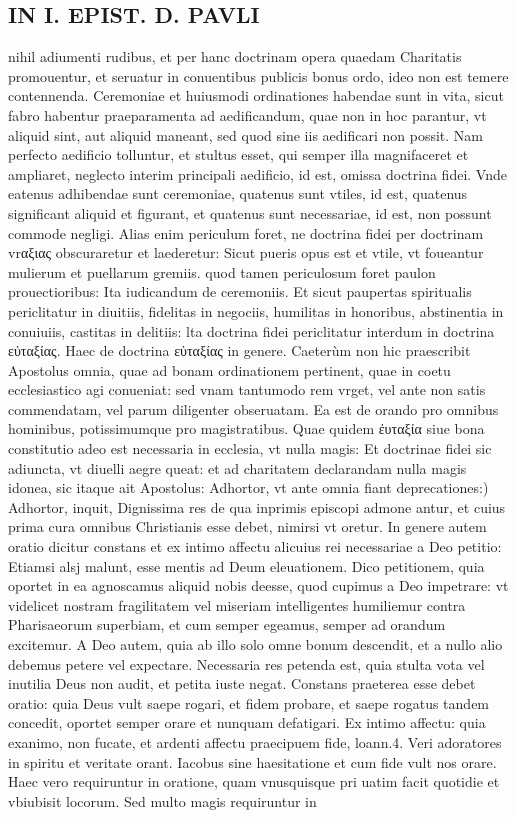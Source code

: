 \documentclass{article}
\begin{document}
\begin{pages}
\section*{IN I. EPIST. D. PAVLI }
\marginpar{[ p.64 ]}\pstart nihil adiumenti rudibus, et per hanc doctrinam opera quaedam Charitatis promouentur, et seruatur in conuentibus publicis bonus ordo, ideo non est temere contennenda. Ceremoniae et huiusmodi ordinationes habendae sunt in vita, sicut fabro habentur praeparamenta ad aedificandum, quae non in hoc parantur, vt aliquid sint, aut aliquid maneant, sed quod sine iis aedificari non possit. Nam perfecto aedificio tolluntur, et stultus esset, qui semper illa magnifaceret et ampliaret, neglecto interim principali aedificio, id est, omissa doctrina fidei. Vnde eatenus adhibendae sunt ceremoniae, quatenus sunt vtiles, id est, quatenus significant aliquid et figurant, et quatenus sunt necessariae, id est, non possunt commode negligi. Alias enim periculum foret, ne doctrina fidei per doctrinam vrαξιας obscuraretur et laederetur: Sicut pueris opus est et vtile, vt foueantur mulierum et puellarum gremiis. quod tamen periculosum foret paulon prouectioribus: Ita iudicandum de ceremoniis. Et sicut paupertas spiritualis periclitatur in diuitiis, fidelitas in negociis, humilitas in honoribus, abstinentia in conuiuiis, castitas in delitiis: lta doctrina fidei periclitatur interdum in doctrina εὐταξίας. Haec de doctrina εὐταξίας in genere.  \pend\pstart Caeterùm non hic praescribit Apostolus omnia, quae ad bonam ordinationem pertinent, quae in coetu ecclesiastico agi conueniat: sed vnam tantumodo rem vrget, vel ante non satis commendatam, vel parum diligenter obseruatam. Ea est de orando pro omnibus hominibus, potissimumque pro magistratibus. Quae quidem ἐυταξία siue bona constitutio adeo est necessaria in ecclesia, vt nulla magis: Et doctrinae fidei sic adiuncta, vt diuelli aegre queat: et ad charitatem declarandam nulla magis idonea, sic itaque  ait Apostolus: Adhortor, vt ante omnia fiant deprecationes:) Adhortor, inquit, Dignissima res de qua inprimis episcopi admone antur, et cuius prima cura omnibus Christianis esse debet, nimirsi vt oretur. In genere autem oratio dicitur constans et ex intimo affectu alicuius rei necessariae a Deo petitio: Etiamsi alsj malunt, esse mentis ad Deum eleuationem. Dico petitionem, quia oportet in ea agnoscamus aliquid nobis deesse, quod cupimus a Deo impetrare: vt videlicet nostram fragilitatem vel miseriam intelligentes humiliemur contra Pharisaeorum superbiam, et cum semper egeamus, semper ad orandum excitemur. A Deo autem, quia ab illo solo omne bonum descendit, et a nullo alio debemus petere vel expectare. Necessaria res petenda est, quia stulta vota vel inutilia Deus non audit, et petita iuste negat. Constans praeterea esse debet oratio: quia Deus vult saepe rogari, et fidem probare, et saepe rogatus tandem concedit, oportet semper orare et nunquam defatigari. Ex intimo affectu: quia exanimo, non fucate, et ardenti affectu praecipuem fide, loann.4. Veri adoratores in spiritu et veritate orant. Iacobus sine haesitatione et cum fide vult nos orare. Haec vero requiruntur in oratione, quam vnusquisque  pri uatim facit quotidie et vbiubisit locorum. Sed multo magis requiruntur in 
\end{pages}
\end{document}
